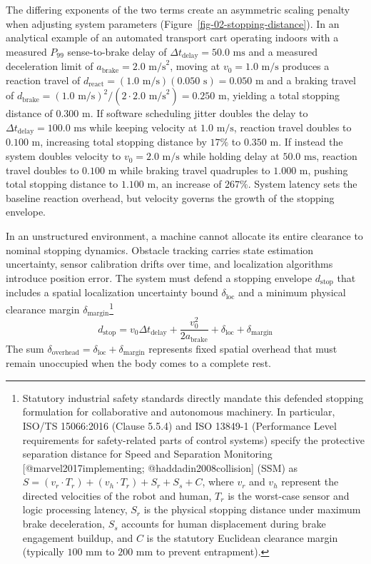 \documentclass[
  letterpaper,
  DIV=11,
  numbers=noendperiod]{scrartcl}
\begin{document}
The differing exponents of the two terms create an asymmetric scaling
penalty when adjusting system parameters
(Figure~\ref{fig-02-stopping-distance}). In an analytical example of an
automated transport cart operating indoors with a measured \(P_{99}\)
sense-to-brake delay of \(\Delta t_{\text{delay}} = 50.0\text{ ms}\) and
a measured deceleration limit of
\(a_{\text{brake}} = 2.0\text{ m/s}^2\), moving at
\(v_0 = 1.0\text{ m/s}\) produces a reaction travel of
\(d_{\text{react}} = (1.0\text{ m/s})(0.050\text{ s}) = 0.050\text{ m}\)
and a braking travel of
\(d_{\text{brake}} = (1.0\text{ m/s})^2 / (2 \cdot 2.0\text{ m/s}^2) = 0.250\text{ m}\),
yielding a total stopping distance of \(0.300\text{ m}\). If software
scheduling jitter doubles the delay to
\(\Delta t_{\text{delay}} = 100.0\text{ ms}\) while keeping velocity at
\(1.0\text{ m/s}\), reaction travel doubles to \(0.100\text{ m}\),
increasing total stopping distance by \(17\%\) to \(0.350\text{ m}\). If
instead the system doubles velocity to \(v_0 = 2.0\text{ m/s}\) while
holding delay at \(50.0\text{ ms}\), reaction travel doubles to
\(0.100\text{ m}\) while braking travel quadruples to
\(1.000\text{ m}\), pushing total stopping distance to
\(1.100\text{ m}\), an increase of \(267\%\). System latency sets the
baseline reaction overhead, but velocity governs the growth of the
stopping envelope.

In an unstructured environment, a machine cannot allocate its entire
clearance to nominal stopping dynamics. Obstacle tracking carries state
estimation uncertainty, sensor calibration drifts over time, and
localization algorithms introduce position error. The system must defend
a stopping envelope \(d_{\text{stop}}\) that includes a spatial
localization uncertainty bound \(\delta_{\text{loc}}\) and a minimum
physical clearance margin \(\delta_{\text{margin}}\)\footnote{Statutory
  industrial safety standards directly mandate this defended stopping
  formulation for collaborative and autonomous machinery. In particular,
  ISO/TS 15066:2016 (Clause 5.5.4) and ISO 13849-1 (Performance Level
  requirements for safety-related parts of control systems) specify the
  protective separation distance for Speed and Separation Monitoring
  {[}@marvel2017implementing; @haddadin2008collision{]} (SSM) as
  \(S = (v_r \cdot T_r) + (v_h \cdot T_r) + S_r + S_s + C\), where
  \(v_r\) and \(v_h\) represent the directed velocities of the robot and
  human, \(T_r\) is the worst-case sensor and logic processing latency,
  \(S_r\) is the physical stopping distance under maximum brake
  deceleration, \(S_s\) accounts for human displacement during brake
  engagement buildup, and \(C\) is the statutory Euclidean clearance
  margin (typically \(100\text{ mm}\) to \(200\text{ mm}\) to prevent
  entrapment).}
\[d_{\text{stop}} = v_0 \Delta t_{\text{delay}} + \frac{v_0^2}{2 a_{\text{brake}}} + \delta_{\text{loc}} + \delta_{\text{margin}}\]
The sum
\(\delta_{\text{overhead}} = \delta_{\text{loc}} + \delta_{\text{margin}}\)
represents fixed spatial overhead that must remain unoccupied when the
body comes to a complete rest.
\end{document}
